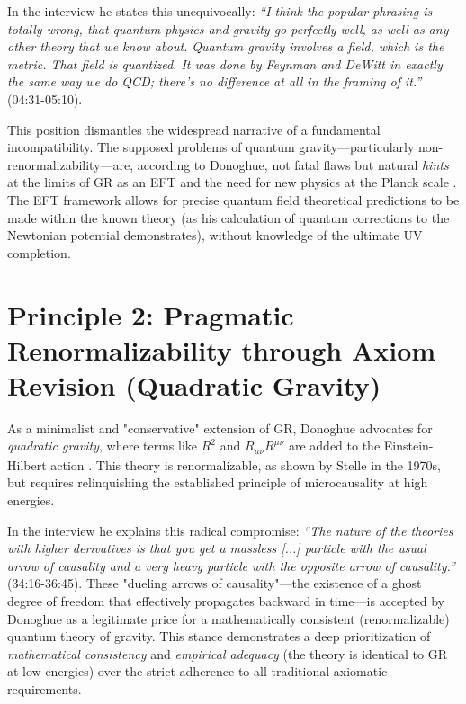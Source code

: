 	In the interview he states this unequivocally: \emph{``I think the popular phrasing is totally wrong, that quantum physics and gravity go perfectly well, as well as any other theory that we know about. Quantum gravity involves a field, which is the metric. That field is quantized. It was done by Feynman and DeWitt in exactly the same way we do QCD; there's no difference at all in the framing of it.''} \cite{DonoghueInterview2025} (04:31-05:10).
	
	This position dismantles the widespread narrative of a fundamental incompatibility. The supposed problems of quantum gravity—particularly non-renormalizability—are, according to Donoghue, not fatal flaws but natural \emph{hints} at the limits of GR as an EFT and the need for new physics at the Planck scale \cite{Donoghue1995}. The EFT framework allows for precise quantum field theoretical predictions to be made within the known theory (as his calculation of quantum corrections to the Newtonian potential demonstrates), without knowledge of the ultimate UV completion.
	
	\section{Principle 2: Pragmatic Renormalizability through Axiom Revision (Quadratic Gravity)}
	
	As a minimalist and "conservative" extension of GR, Donoghue advocates for \emph{quadratic gravity}, where terms like $R^2$ and $R_{\mu\nu}R^{\mu\nu}$ are added to the Einstein-Hilbert action \cite{Salvio2018}. This theory is renormalizable, as shown by Stelle in the 1970s, but requires relinquishing the established principle of microcausality at high energies.
	
	In the interview he explains this radical compromise: \emph{``The nature of the theories with higher derivatives is that you get a massless [...] particle with the usual arrow of causality and a very heavy particle with the opposite arrow of causality.''} \cite{DonoghueInterview2025} (34:16-36:45). These "dueling arrows of causality"—the existence of a ghost degree of freedom that effectively propagates backward in time—is accepted by Donoghue as a legitimate price for a mathematically consistent (renormalizable) quantum theory of gravity. This stance demonstrates a deep prioritization of \emph{mathematical consistency} and \emph{empirical adequacy} (the theory is identical to GR at low energies) over the strict adherence to all traditional axiomatic requirements.
	
